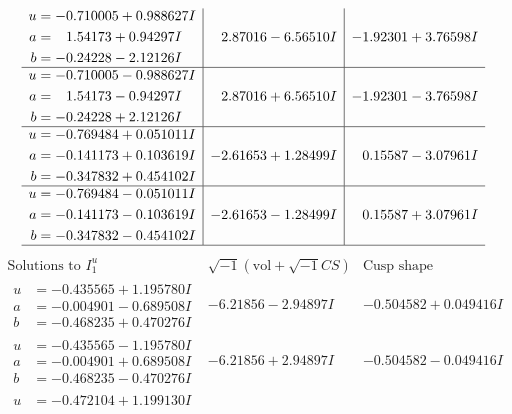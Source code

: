 \documentclass[1p]{elsarticle_modified}
\theoremstyle{definition}
\newcommand{\I}{\sqrt{-1}}
\begin{document}
$$\begin{array}{c|c|c}
\begin{aligned}
u &= -0.710005 + 0.988627 I \\
a &= \phantom{-}1.54173 + 0.94297 I \\
b &= -0.24228 - 2.12126 I\end{aligned}
 & \phantom{-}2.87016 - 6.56510 I & -1.92301 + 3.76598 I \\ \hline\begin{aligned}
u &= -0.710005 - 0.988627 I \\
a &= \phantom{-}1.54173 - 0.94297 I \\
b &= -0.24228 + 2.12126 I\end{aligned}
 & \phantom{-}2.87016 + 6.56510 I & -1.92301 - 3.76598 I \\ \hline\begin{aligned}
u &= -0.769484 + 0.051011 I \\
a &= -0.141173 + 0.103619 I \\
b &= -0.347832 + 0.454102 I\end{aligned}
 & -2.61653 + 1.28499 I & \phantom{-}0.15587 - 3.07961 I \\ \hline\begin{aligned}
u &= -0.769484 - 0.051011 I \\
a &= -0.141173 - 0.103619 I \\
b &= -0.347832 - 0.454102 I\end{aligned}
 & -2.61653 - 1.28499 I & \phantom{-}0.15587 + 3.07961 I\\
 \hline 
 \end{array}$$\newpage$$\begin{array}{c|c|c}  
\text{Solutions to }I^u_{1}& \I (\text{vol} + \sqrt{-1}CS) & \text{Cusp shape}\\
 \hline 
\begin{aligned}
u &= -0.435565 + 1.195780 I \\
a &= -0.004901 - 0.689508 I \\
b &= -0.468235 + 0.470276 I\end{aligned}
 & -6.21856 - 2.94897 I & -0.504582 + 0.049416 I \\ \hline\begin{aligned}
u &= -0.435565 - 1.195780 I \\
a &= -0.004901 + 0.689508 I \\
b &= -0.468235 - 0.470276 I\end{aligned}
 & -6.21856 + 2.94897 I & -0.504582 - 0.049416 I \\ \hline\begin{aligned}
u &= -0.472104 + 1.199130 I \\

\end{aligned}
\end{array}$$
\end{document}
